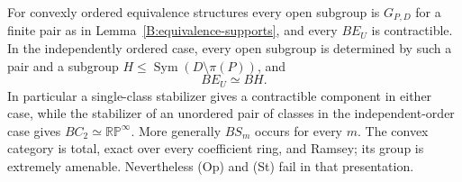 \begin{theorem}
\label{B:equivalence-types}
For convexly ordered equivalence structures every open subgroup is
$G_{P,D}$ for a finite pair as in Lemma~\ref{B:equivalence-supports},
and every $BE_U$ is contractible. In the independently ordered case,
every open subgroup is determined by such a pair and a subgroup
$H\leq\operatorname{Sym}(D\setminus\pi(P))$, and
\[
 BE_U\simeq BH.
\]
In particular a single-class stabilizer gives a contractible
component in either case, while the stabilizer of an unordered pair
of classes in the independent-order case gives
$BC_2\simeq\mathbb{RP}^{\infty}$. More generally $BS_m$ occurs for
every $m$. The convex category is total, exact over every coefficient
ring, and Ramsey; its group is extremely amenable. Nevertheless
(Op) and (St) fail in that presentation.
\end{theorem}
